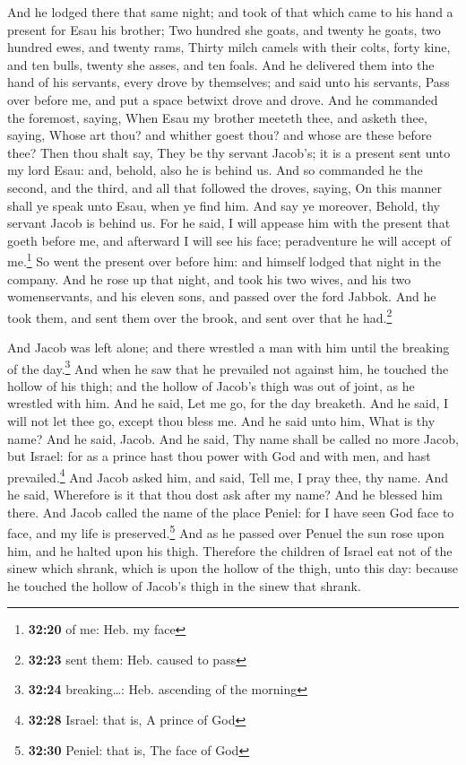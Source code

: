  And he lodged there that same night; and took of that
which came to his hand a present for Esau his brother; 
Two hundred she goats, and twenty he goats, two hundred ewes, and twenty
rams,  Thirty milch camels with their colts, forty kine,
and ten bulls, twenty she asses, and ten foals.  And he
delivered them into the hand of his servants, every drove by themselves;
and said unto his servants, Pass over before me, and put a space betwixt
drove and drove.  And he commanded the foremost, saying,
When Esau my brother meeteth thee, and asketh thee, saying, Whose art
thou? and whither goest thou? and whose are these before thee?
 Then thou shalt say, They be thy servant Jacob's; it is
a present sent unto my lord Esau: and, behold, also he is behind us.
 And so commanded he the second, and the third, and all
that followed the droves, saying, On this manner shall ye speak unto
Esau, when ye find him.  And say ye moreover, Behold, thy
servant Jacob is behind us. For he said, I will appease him with the
present that goeth before me, and afterward I will see his face;
peradventure he will accept of me.\footnote{\textbf{32:20} of me: Heb.
  my face}  So went the present over before him: and
himself lodged that night in the company.  And he rose up
that night, and took his two wives, and his two womenservants, and his
eleven sons, and passed over the ford Jabbok.  And he
took them, and sent them over the brook, and sent over that he
had.\footnote{\textbf{32:23} sent them: Heb. caused to pass}

 And Jacob was left alone; and there wrestled a man with
him until the breaking of the day.\footnote{\textbf{32:24}
  breaking\ldots: Heb. ascending of the morning}  And
when he saw that he prevailed not against him, he touched the hollow of
his thigh; and the hollow of Jacob's thigh was out of joint, as he
wrestled with him.  And he said, Let me go, for the day
breaketh. And he said, I will not let thee go, except thou bless me.
 And he said unto him, What is thy name? And he said,
Jacob.  And he said, Thy name shall be called no more
Jacob, but Israel: for as a prince hast thou power with God and with
men, and hast prevailed.\footnote{\textbf{32:28} Israel: that is, A
  prince of God}  And Jacob asked him, and said, Tell me,
I pray thee, thy name. And he said, Wherefore is it that thou dost ask
after my name? And he blessed him there.  And Jacob
called the name of the place Peniel: for I have seen God face to face,
and my life is preserved.\footnote{\textbf{32:30} Peniel: that is, The
  face of God}  And as he passed over Penuel the sun rose
upon him, and he halted upon his thigh.  Therefore the
children of Israel eat not of the sinew which shrank, which is upon the
hollow of the thigh, unto this day: because he touched the hollow of
Jacob's thigh in the sinew that shrank.


